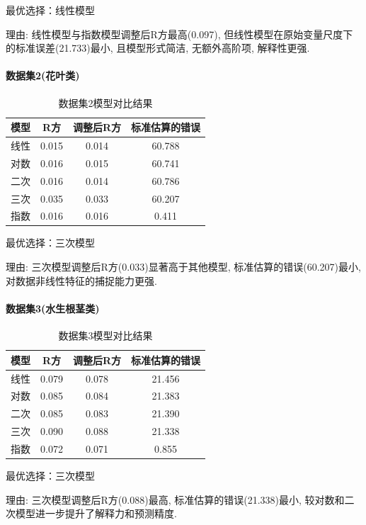 \documentclass{cumcmthesis}
\begin{document}
最优选择：线性模型

理由: 线性模型与指数模型调整后R方最高(0.097), 但线性模型在原始变量尺度下的标准误差(21.733)最小, 且模型形式简洁, 无额外高阶项, 解释性更强. 


\paragraph{数据集2(花叶类)}
\begin{table}[H]
\centering
\begin{tabular}{cccc}
\hline
模型 & R方 & 调整后R方 & 标准估算的错误 \\
\hline
线性 & 0.015 & 0.014 & 60.788 \\
对数 & 0.016 & 0.015 & 60.741 \\
二次 & 0.016 & 0.014 & 60.786 \\
三次 & 0.035 & 0.033 & 60.207 \\
指数 & 0.016 & 0.016 & 0.411 \\
\hline
\end{tabular}
\caption{数据集2模型对比结果}
\label{tab:dataset2}
\end{table}

最优选择：三次模型

理由: 三次模型调整后R方(0.033)显著高于其他模型, 标准估算的错误(60.207)最小, 对数据非线性特征的捕捉能力更强. 


\paragraph{数据集3(水生根茎类)}
\begin{table}[H]
\centering
\begin{tabular}{cccc}
\hline
模型 & R方 & 调整后R方 & 标准估算的错误 \\
\hline
线性 & 0.079 & 0.078 & 21.456 \\
对数 & 0.085 & 0.084 & 21.383 \\
二次 & 0.085 & 0.083 & 21.390 \\
三次 & 0.090 & 0.088 & 21.338 \\
指数 & 0.072 & 0.071 & 0.855 \\
\hline
\end{tabular}
\caption{数据集3模型对比结果}
\label{tab:dataset3}
\end{table}

最优选择：三次模型

理由: 三次模型调整后R方(0.088)最高, 标准估算的错误(21.338)最小, 较对数和二次模型进一步提升了解释力和预测精度. 
\end{document}
